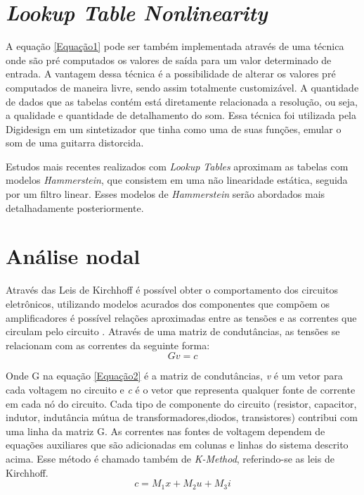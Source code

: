 \section*{\textit{Lookup Table Nonlinearity}}

A equação \ref{Equação1} pode ser também implementada através de uma técnica onde são pré computados os valores de saída para um valor determinado de entrada. A vantagem dessa técnica é a possibilidade de alterar os valores pré computados de maneira livre, sendo assim totalmente customizável\cite{pakarinen2009review}. A quantidade de dados que as tabelas contém está diretamente relacionada a resolução, ou seja, a qualidade e quantidade de detalhamento do som. Essa técnica foi utilizada pela Digidesign em um sintetizador que tinha como uma de suas funções, emular o som de uma guitarra distorcida. 

Estudos mais recentes realizados com \textit{Lookup Tables}
aproximam as tabelas com modelos \textit{Hammerstein}, que consistem em uma não linearidade estática, seguida por um filtro linear\cite{LUTFilter}. Esses modelos de \textit{Hammerstein} serão abordados mais detalhadamente posteriormente.

\section*{Análise nodal}
Através das Leis de Kirchhoff é possível obter o comportamento dos circuitos eletrônicos, utilizando modelos acurados dos componentes que compõem os amplificadores é possível relações aproximadas entre as tensões e as correntes que circulam pelo circuito \cite{pakarinen2009review}. Através de uma matriz de condutâncias, as tensões se relacionam com as correntes da seguinte forma:
\begin{equation}
Gv = \textit{c} 
\label{Equação2}
\end{equation}

Onde G na equação \ref{Equação2} é a matriz de condutâncias, \textit{v} é um vetor para cada voltagem no circuito e \textit{c} é o vetor que representa qualquer fonte de corrente em cada nó do circuito. Cada tipo de componente do circuito (resistor, capacitor, indutor, indutância mútua de transformadores,diodos, transistores) contribui com uma linha da matriz G. As correntes nas fontes de voltagem dependem de equações auxiliares que são adicionadas em colunas e linhas do sistema descrito acima. Esse método é chamado também de \textit{K-Method}, referindo-se as leis de Kirchhoff.
\begin{equation}
c=M_{1}x + M_{2}u + M_{3}i
\label{Equação3}
\end{equation}

